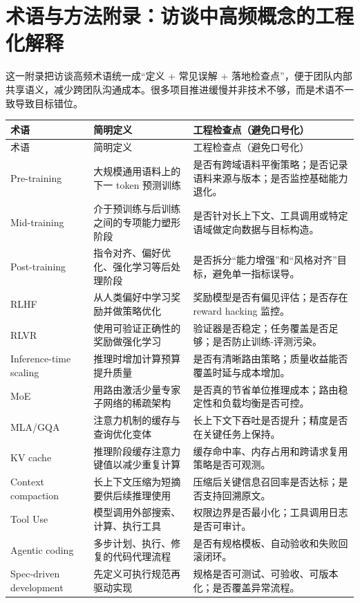 \section{术语与方法附录：访谈中高频概念的工程化解释}

这一附录把访谈高频术语统一成“定义 + 常见误解 + 落地检查点”，便于团队内部共享语义，减少跨团队沟通成本。很多项目推进缓慢并非技术不够，而是术语不一致导致目标错位。

\begin{longtable}{p{}p{}p{}}
\toprule
术语 & 简明定义 & 工程检查点（避免口号化） \\
\midrule
\endfirsthead
\toprule
术语 & 简明定义 & 工程检查点（避免口号化） \\
\midrule
\endhead
Pre-training & 大规模通用语料上的下一 token 预测训练 & 是否有跨域语料平衡策略；是否记录语料来源与版本；是否监控基础能力退化。 \\
Mid-training & 介于预训练与后训练之间的专项能力塑形阶段 & 是否针对长上下文、工具调用或特定语域做定向数据与目标构造。 \\
Post-training & 指令对齐、偏好优化、强化学习等后处理阶段 & 是否拆分“能力增强”和“风格对齐”目标，避免单一指标误导。 \\
RLHF & 从人类偏好中学习奖励并做策略优化 & 奖励模型是否有偏见评估；是否存在 reward hacking 监控。 \\
RLVR & 使用可验证正确性的奖励做强化学习 & 验证器是否稳定；任务覆盖是否足够；是否防止训练-评测污染。 \\
Inference-time scaling & 推理时增加计算预算提升质量 & 是否有清晰路由策略；质量收益能否覆盖时延与成本增加。 \\
MoE & 用路由激活少量专家子网络的稀疏架构 & 是否真的节省单位推理成本；路由稳定性和负载均衡是否可控。 \\
MLA/GQA & 注意力机制的缓存与查询优化变体 & 长上下文下吞吐是否提升；精度是否在关键任务上保持。 \\
KV cache & 推理阶段缓存注意力键值以减少重复计算 & 缓存命中率、内存占用和跨请求复用策略是否可观测。 \\
Context compaction & 长上下文压缩为短摘要供后续推理使用 & 压缩后关键信息召回率是否达标；是否支持回溯原文。 \\
Tool Use & 模型调用外部搜索、计算、执行工具 & 权限边界是否最小化；工具调用日志是否可审计。 \\
Agentic coding & 多步计划、执行、修复的代码代理流程 & 是否有规格模板、自动验收和失败回滚闭环。 \\
Spec-driven development & 先定义可执行规范再驱动实现 & 规格是否可测试、可验收、可版本化；是否覆盖异常流程。 \\

\end{longtable}
